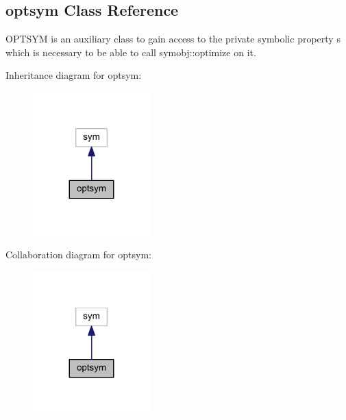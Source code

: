 \hypertarget{classoptsym}{}\subsection{optsym Class Reference}
\label{classoptsym}


O\+P\+T\+S\+Y\+M is an auxiliary class to gain access to the private symbolic property {\ttfamily s} which is necessary to be able to call symobj\+::optimize on it.  




Inheritance diagram for optsym\+:\nopagebreak
\begin{figure}[H]
\begin{center}
\leavevmode
\includegraphics[width=128pt]{classoptsym__inherit__graph}
\end{center}
\end{figure}


Collaboration diagram for optsym\+:\nopagebreak
\begin{figure}[H]
\begin{center}
\leavevmode
\includegraphics[width=128pt]{classoptsym__coll__graph}
\end{center}
\end{figure}
